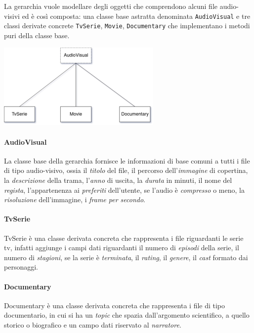 La gerarchia vuole modellare degli oggetti che comprendono alcuni file audio-visivi ed è così composta: una classe base astratta denominata \texttt{AudioVisual} e tre classi derivate concrete \texttt{TvSerie}, \texttt{Movie}, \texttt{Documentary} che implementano i metodi puri della classe base. 

\begin{center}
    \includegraphics[width=0.6\textwidth]{gerarchia}
\end{center}

\paragraph{AudioVisual}
La classe base della gerarchia fornisce le informazioni di base comuni a tutti i file di tipo audio-visivo, ossia il \textit{titolo} del file, il percorso dell'\textit{immagine} di copertina, la \textit{descrizione} della trama, l'\textit{anno} di uscita, la \textit{durata} in minuti, il nome del \textit{regista}, l'appartenenza ai \textit{preferiti} dell'utente, se l'audio è \textit{compresso} o meno, la \textit{risoluzione} dell'immagine, i \textit{frame per secondo}.

\paragraph{TvSerie}
TvSerie è una classe derivata concreta che rappresenta i file riguardanti le serie tv, infatti aggiunge i campi dati riguardanti il numero di \textit{episodi} della serie, il numero di \textit{stagioni}, se la serie è \textit{terminata}, il \textit{rating}, il \textit{genere}, il \textit{cast} formato dai personaggi.

\paragraph{Documentary}
Documentary è una classe derivata concreta che rappresenta i file di tipo documentario, in cui si ha un \textit{topic} che spazia dall'argomento scientifico, a quello storico o biografico e un campo dati riservato al \textit{narratore}.

